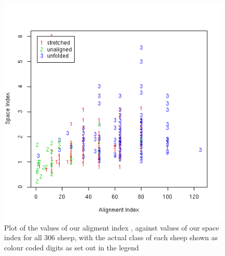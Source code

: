 %

\begin{figure}[!h]
  \centering
  \includegraphics[width=1.1\textwidth]{figalign_space.png}
  \caption{Plot of the values of our aligment index , against values of our space index  for all 306 sheep, with the actual class of each sheep shown as colour coded digits as set out in the legend}
  \label{fig:align_space}
\end{figure}

%

